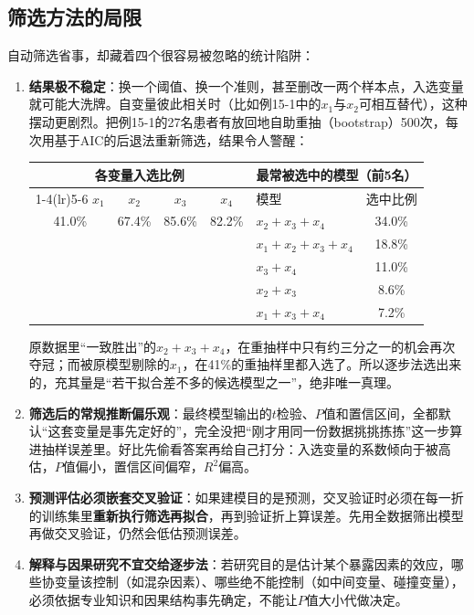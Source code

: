 \subsection{筛选方法的局限}
自动筛选省事，却藏着四个很容易被忽略的统计陷阱：
\begin{enumerate}
\item \textbf{结果极不稳定}：换一个阈值、换一个准则，甚至删改一两个样本点，入选变量就可能大洗牌。自变量彼此相关时（比如例15-1中的$x_1$与$x_2$可相互替代），这种摆动更剧烈。把例15-1的27名患者有放回地自助重抽（bootstrap）500次，每次用基于AIC的后退法重新筛选，结果令人警醒：
\begin{center}\small
\begin{tabular}{cccc@{\qquad}lc}
\toprule \multicolumn{4}{c}{各变量入选比例}&\multicolumn{2}{c}{最常被选中的模型（前5名）}\\\cmidrule(lr){1-4}\cmidrule(lr){5-6}
$x_1$&$x_2$&$x_3$&$x_4$&模型&选中比例\\\midrule
41.0\%&67.4\%&85.6\%&82.2\%&$x_2+x_3+x_4$&34.0\%\\
&&&&$x_1+x_2+x_3+x_4$&18.8\%\\
&&&&$x_3+x_4$&11.0\%\\
&&&&$x_2+x_3$&8.6\%\\
&&&&$x_1+x_3+x_4$&7.2\%\\\bottomrule
\end{tabular}
\end{center}
原数据里“一致胜出”的$x_2+x_3+x_4$，在重抽样中只有约三分之一的机会再次夺冠；而被原模型剔除的$x_1$，在41\%的重抽样里都入选了。所以逐步法选出来的，充其量是“若干拟合差不多的候选模型之一”，绝非唯一真理。
\item \textbf{筛选后的常规推断偏乐观}：最终模型输出的$t$检验、$P$值和置信区间，全都默认“这套变量是事先定好的”，完全没把“刚才用同一份数据挑挑拣拣”这一步算进抽样误差里。好比先偷看答案再给自己打分：入选变量的系数倾向于被高估，$P$值偏小，置信区间偏窄，$R^2$偏高。
\item \textbf{预测评估必须嵌套交叉验证}：如果建模目的是预测，交叉验证时必须在每一折的训练集里\textbf{重新执行筛选再拟合}，再到验证折上算误差。先用全数据筛出模型再做交叉验证，仍然会低估预测误差。
\item \textbf{解释与因果研究不宜交给逐步法}：若研究目的是估计某个暴露因素的效应，哪些协变量该控制（如混杂因素）、哪些绝不能控制（如中间变量、碰撞变量），必须依据专业知识和因果结构事先确定，不能让$P$值大小代做决定。
\end{enumerate}

